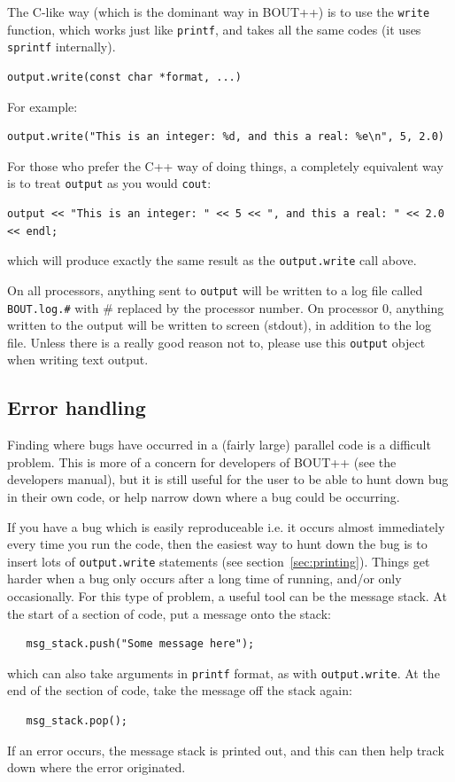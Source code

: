 \documentclass[12pt]{article}
\newcommand{\code}[1]{\texttt{#1}}
\begin{document}
The C-like way (which is the dominant way in BOUT++) is to use the \code{write}
function, which works just like \code{printf}, and takes all the same codes (it
uses \code{sprintf} internally).
%
%
\begin{lstlisting}
output.write(const char *format, ...)
\end{lstlisting}
%
For example:
%
\begin{lstlisting}
output.write("This is an integer: %d, and this a real: %e\n", 5, 2.0)
\end{lstlisting}
%
For those who prefer the C++ way of doing things, a completely equivalent way
is to treat \code{output} as you would \code{cout}:
%
\begin{lstlisting}
output << "This is an integer: " << 5 << ", and this a real: " << 2.0 << endl;
\end{lstlisting}
%
which will produce exactly the same result as the \code{output.write} call
above.

On all processors, anything sent to \code{output} will be written to a log file
called \texttt{BOUT.log.\#} with \# replaced by the processor number. On
processor 0, anything written to the output will be written to screen (stdout),
in addition to the log file.  Unless there is a really good reason not to,
please use this \code{output} object when writing text output.



\subsection{Error handling}
%
Finding where bugs have occurred in a (fairly large) parallel code is a
difficult problem.  This is more of a concern for developers of BOUT++ (see the
developers manual), but it is still useful for the user to be able to hunt down
bug in their own code, or help narrow down where a bug could be occurring.

If you have a bug which is easily reproduceable i.e. it occurs almost
immediately every time you run the code, then the easiest way to hunt down the
bug is to insert lots of \code{output.write} statements (see
section~\ref{sec:printing}). Things get harder when a bug only occurs after a
long time of running, and/or only occasionally. For this type of problem, a
useful tool can be the message stack.  At the start of a section of code, put a
message onto the stack:
%
%
\begin{lstlisting}
   msg_stack.push("Some message here");
\end{lstlisting}
%
which can also take arguments in \code{printf} format, as with
\code{output.write}. At the end of the section of code, take the message off
the stack again:
%
\begin{lstlisting}
   msg_stack.pop();
\end{lstlisting}
%
If an error occurs, the message stack is printed out, and this can then help
track down where the error originated.
\end{document}
